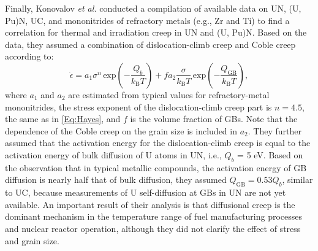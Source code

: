 \documentclass[preprint,12pt,sort&compress]{elsarticle} %
\newcommand{\?}{\stackrel{?}{=}}
\providecommand{\DIFaddtex}[1]{{\sf #1}} %
\providecommand{\DIFaddbegin}{\protect\color{blue}} %
\providecommand{\DIFaddend}{\protect\color{black}} %
\providecommand{\DIFdelbegin}{\protect\color{red}} %
\providecommand{\DIFdelend}{\protect\color{black}} %
\providecommand{\DIFadd}[1]{\texorpdfstring{\DIFaddtex{#1}}{#1}} %
\newcommand{\DIFscaledelfig}{0.5}
\newlength{\DIFdelgraphicswidth} %
\newlength{\DIFdelgraphicsheight} %
\newcommand{\DIFaddincludegraphics}[2][]{{\color{blue}\fbox{\DIFOincludegraphics[#1]{#2}}}} %
\newcommand{\DIFdelincludegraphics}[2][]{%
\sbox{\DIFdelgraphicsbox}{\DIFOincludegraphics[#1]{#2}}%
\settoboxwidth{\DIFdelgraphicswidth}{\DIFdelgraphicsbox} %
\settoboxtotalheight{\DIFdelgraphicsheight}{\DIFdelgraphicsbox} %
\scalebox{\DIFscaledelfig}{%
\parbox[b]{\DIFdelgraphicswidth}{\usebox{\DIFdelgraphicsbox}\\[-\baselineskip] \rule{\DIFdelgraphicswidth}{0em}}\llap{\resizebox{\DIFdelgraphicswidth}{\DIFdelgraphicsheight}{%
\setlength{\unitlength}{\DIFdelgraphicswidth}%
\begin{picture}(1,1)%
\thicklines\linethickness{2pt} %
{\color[rgb]{1,0,0}\put(0,0){\framebox(1,1){}}}%
{\color[rgb]{1,0,0}\put(0,0){\line( 1,1){1}}}%
{\color[rgb]{1,0,0}\put(0,1){\line(1,-1){1}}}%
\end{picture}%
}\hspace*{3pt}}} %
} %
\DeclareRobustCommand{\DIFaddbegin}{\DIFOaddbegin \let\includegraphics\DIFaddincludegraphics} %
\DeclareRobustCommand{\DIFaddend}{\DIFOaddend \let\includegraphics\DIFOincludegraphics} %
\DeclareRobustCommand{\DIFdelbegin}{\DIFOdelbegin \let\includegraphics\DIFdelincludegraphics} %
\DeclareRobustCommand{\DIFdelend}{\DIFOaddend \let\includegraphics\DIFOincludegraphics} %
\begin{document}
Finally, Konovalov \textit{et al.} \cite{Konovalov2016} conducted a compilation of available data on UN, (U, Pu)N, UC, and mononitrides of refractory metals (e.g., Zr and Ti) to find a correlation for thermal and irradiation creep in UN and (U, Pu)N. Based on the data, they assumed a combination of dislocation-climb creep and Coble creep according to:
\DIFdelbegin %
\DIFdelend \DIFaddbegin \begin{equation}
\Dot{\epsilon} = a_1 \sigma^n \, \mathrm{exp} \! \left( - \frac{Q_b}{k_\mathrm{B} T} \right) + f a_2 \frac{\sigma}{k_\mathrm{B} T} \, \mathrm{exp} \! \left( - \frac{ Q_\mathrm{GB}}{k_\mathrm{B} T} \right),
\end{equation}\DIFaddend 
where $a_1$ and $a_2$ are estimated from typical values for refractory-metal mononitrides, the stress exponent of the dislocation-climb creep part is $n=4.5$, the same as in \cref{Eq:Hayes}, and $f$ is the volume fraction of GBs. Note that the dependence of the Coble creep on the grain size is included in $a_2$. They further assumed that the activation energy for the dislocation-climb creep is equal to the activation energy of bulk diffusion of U atoms in UN, i.e., $Q_b$ = 5 eV. Based on the observation that in typical metallic compounds, the activation energy of GB diffusion is nearly half that of bulk diffusion, they assumed $Q_\mathrm{GB} = 0.53 Q_b$\DIFaddbegin \DIFadd{, }\DIFaddend similar to UC, because measurements of U self-diffusion at GBs in UN are not yet available. An important result of their analysis is that diffusional creep is the dominant mechanism in the temperature range of fuel manufacturing processes and nuclear reactor operation, although they did not clarify the effect of stress and grain size.
\end{document}
